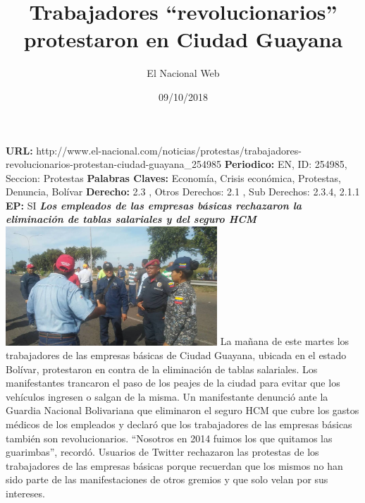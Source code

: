 \documentclass{article}%
\title{\textbf{Trabajadores “revolucionarios” protestaron en Ciudad Guayana}}%
\author{El Nacional Web}%
\date{09/10/2018}%
\begin{document}
%
\normalsize%
\maketitle%
\textbf{URL: }%
http://www.el{-}nacional.com/noticias/protestas/trabajadores{-}revolucionarios{-}protestan{-}ciudad{-}guayana\_254985\newline%
%
\textbf{Periodico: }%
EN, %
ID: %
254985, %
Seccion: %
Protestas\newline%
%
\textbf{Palabras Claves: }%
Economía, Crisis económica, Protestas, Denuncia, Bolívar\newline%
%
\textbf{Derecho: }%
2.3%
, Otros Derechos: %
2.1%
, Sub Derechos: %
2.3.4, 2.1.1%
\newline%
%
\textbf{EP: }%
SI\newline%
\newline%
%
\textbf{\textit{Los empleados de las empresas básicas rechazaron la eliminación de tablas salariales y del seguro HCM}}%
\newline%
\newline%
%
\includegraphics[width=300px]{10.jpg}%
\newline%
%
La mañana de este martes los trabajadores de las empresas básicas de Ciudad Guayana, ubicada en el estado Bolívar, protestaron en contra de la eliminación de tablas salariales.%
\newline%
%
Los manifestantes trancaron el paso de los peajes de la ciudad para evitar que los vehículos ingresen o salgan de la misma.%
\newline%
%
Un manifestante denunció ante la Guardia Nacional Bolivariana que eliminaron el seguro HCM que cubre los gastos médicos de los empleados y declaró que los trabajadores de las empresas básicas también son revolucionarios.%
\newline%
%
“Nosotros en 2014 fuimos los que quitamos las guarimbas”, recordó.%
\newline%
%
Usuarios de Twitter rechazaron las protestas de los trabajadores de las empresas básicas porque recuerdan que los mismos no han sido parte de las manifestaciones de otros gremios y que solo velan por sus intereses.%
\newline%
%
\end{document}
